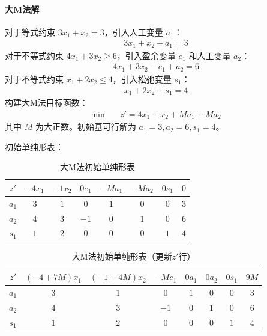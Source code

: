 \documentclass[12pt]{article}
\theoremstyle{plain}
\theoremstyle{definition}
\begin{document}
\paragraph{大M法解}
对于等式约束 $3x_1 + x_2 = 3$，引入人工变量 $a_1$：
\begin{align*}
    3x_1 + x_2 + a_1 = 3
\end{align*}
对于不等式约束 $4x_1 + 3x_2 \geq 6$，引入盈余变量 $e_1$ 和人工变量 $a_2$：
\begin{align*}
    4x_1 + 3x_2 - e_1 + a_2 = 6
\end{align*}
对于不等式约束 $x_1 + 2x_2 \leq 4$，引入松弛变量 $s_1$：
\begin{align*}
    x_1 + 2x_2 + s_1 = 4
\end{align*}
构建大M法目标函数：
\begin{align*}
    \min \quad & z' = 4x_1 + x_2 + M a_1 + M a_2
\end{align*}
其中 $M$ 为大正数。初始基可行解为 $a_1 = 3, a_2 = 6, s_1 = 4$。

初始单纯形表：
\begin{table}[!htbp]
    \centering
    \caption{大M法初始单纯形表}
    \begin{tabular}{c|cccccc|c}
        \hline
        $z'$ & $-4x_1$ & $-1x_2$ & $0e_1$ & $-Ma_1$ & $-Ma_2$ & $0s_1$ & $0$ \\
        \hline
        $a_1$ & $3$ & $1$ & $0$ & $1$ & $0$ & $0$ & $3$ \\
        $a_2$ & $4$ & $3$ & $-1$ & $0$ & $1$ & $0$ & $6$ \\
        $s_1$ & $1$ & $2$ & $0$ & $0$ & $0$ & $1$ & $4$ \\
        \hline
    \end{tabular}
\end{table}

\begin{table}[!htbp]
    \centering
    \caption{大M法初始单纯形表（更新$z'$行）}
    \begin{tabular}{c|cccccc|c}
        \hline
        $z'$ & $(-4+7M)x_1$ & $(-1+4M)x_2$ & $-Me_1$ & $0a_1$ & $0a_2$ & $0s_1$ & $9M$ \\
        \hline
        $a_1$ & $3$ & $1$ & $0$ & $1$ & $0$ & $0$ & $3$ \\
        $a_2$ & $4$ & $3$ & $-1$ & $0$ & $1$ & $0$ & $6$ \\
        $s_1$ & $1$ & $2$ & $0$ & $0$ & $0$ & $1$ & $4$ \\
        \hline
    \end{tabular}
\end{table}
\end{document}
